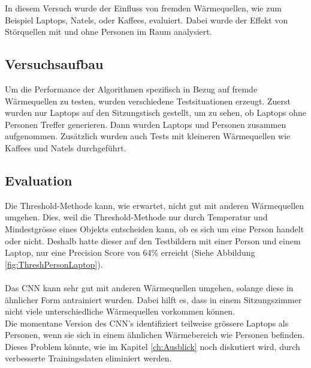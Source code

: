In diesem Versuch wurde der Einfluss von fremden Wärmequellen, wie zum Beispiel Laptops, Natels, oder Kaffees, evaluiert. Dabei wurde der Effekt von Störquellen mit und ohne Personen im Raum analysiert.

\subsection{Versuchsaufbau}

Um die Performance der Algorithmen spezifisch in Bezug auf fremde Wärmequellen zu testen, wurden verschiedene Testsituationen erzeugt. Zuerst wurden nur Laptops auf den Sitzungstisch gestellt, um zu sehen, ob Laptops ohne Personen Treffer generieren. Dann wurden Laptops und Personen zusammen aufgenommen. Zusätzlich wurden auch Tests mit kleineren Wärmequellen wie Kaffees und Natels durchgeführt.


\subsection{Evaluation}

Die Threshold-Methode kann, wie erwartet, nicht gut mit anderen Wärmequellen umgehen. Dies, weil die Threshold-Methode nur durch Temperatur und Mindestgrösse eines Objekts entscheiden kann, ob es sich um eine Person handelt oder nicht. Deshalb hatte dieser auf den Testbildern mit einer Person und einem Laptop, nur eine Precision Score von 64\% erreicht (Siehe Abbildung \ref{fig:ThreshPersonLaptop}).\\
\\
Das \gls{CNN} kann sehr gut mit anderen Wärmequellen umgehen, solange diese in ähnlicher Form antrainiert wurden. Dabei hilft es, dass in einem Sitzungszimmer nicht viele unterschiedliche Wärmequellen vorkommen können. \\
Die momentane Version des \gls{CNN}'s identifiziert teilweise grössere Laptops als Personen, wenn sie sich in einem ähnlichen Wärmebereich wie Personen befinden. Dieses Problem könnte, wie im Kapitel \ref{ch:Ausblick} noch diskutiert wird, durch verbesserte Trainingsdaten eliminiert werden.

